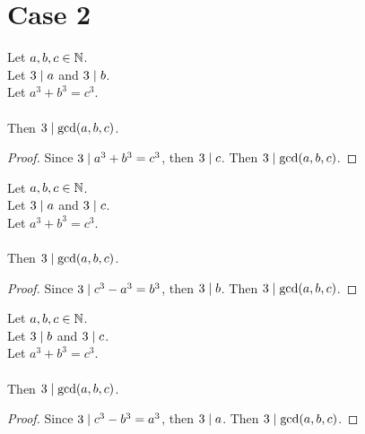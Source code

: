 \chapter{Case 2}

\begin{lemma}
    \label{lmm:three_dvd_gcd_of_dvd_a_of_dvd_b}
    \leanok
    Let $a, b, c \in \mathbb{N}$. \\
    Let $3 \mid a$ and $3 \mid b$. \\
    Let $a ^ 3 + b ^ 3 = c ^ 3$. \\\\
    Then $3 \mid \gcd(a,b,c)$.
\end{lemma}
\begin{proof}
    \leanok
    Since $3 \mid a^3 + b^3 = c^3$, then $3 \mid c$.
    Then $3 \mid \gcd(a,b,c)$.
\end{proof}

\begin{lemma}
    \label{lmm:three_dvd_gcd_of_dvd_a_of_dvd_c}
    \leanok
    Let $a, b, c \in \mathbb{N}$. \\
    Let $3 \mid a$ and $3 \mid c$. \\
    Let $a ^ 3 + b ^ 3 = c ^ 3$. \\\\
    Then $3 \mid \gcd(a,b,c)$.
\end{lemma}
\begin{proof}
    \leanok
    Since $3 \mid c^3 - a^3 = b^3$, then $3 \mid b$.
    Then $3 \mid \gcd(a,b,c)$.
\end{proof}

\begin{lemma}
    \label{lmm:three_dvd_gcd_of_dvd_b_of_dvd_c}
    \leanok
    Let $a, b, c \in \mathbb{N}$. \\
    Let $3 \mid b$ and $3 \mid c$. \\
    Let $a ^ 3 + b ^ 3 = c ^ 3$. \\\\
    Then $3 \mid \gcd(a,b,c)$.
\end{lemma}
\begin{proof}
    \leanok
    Since $3 \mid c^3 - b^3 = a^3$, then $3 \mid a$.
    Then $3 \mid \gcd(a,b,c)$.
\end{proof}

